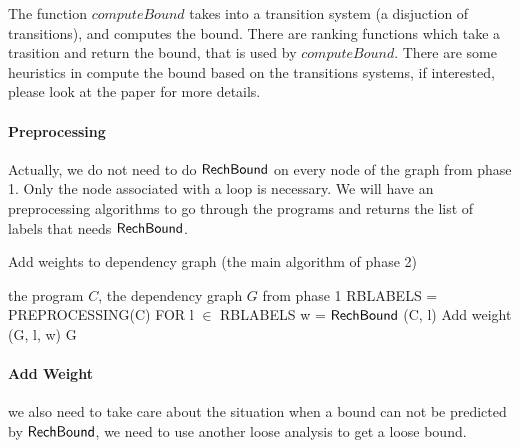 The function $computeBound$ takes into a transition system (a disjuction of transitions), and computes the bound. There are ranking functions which take a trasition and return the bound, that is used by $computeBound$. There are some heuristics in compute the bound based on the transitions systems, if interested, please look at the paper for more details.

\paragraph{Preprocessing} Actually, we do not need to do $\mathsf{RechBound}$ on every node of the graph from phase 1. Only the node associated with a loop is necessary. We will have an preprocessing algorithms to go through the programs and returns the list of labels that needs {$\mathsf{RechBound}$}. 

\begin{algorithm}
\caption{
{Add weights to dependency graph (the main algorithm of phase 2)}
\label{alg:rb}
}
\begin{algorithmic}
\REQUIRE the program $C$, the dependency graph $G$ from phase 1
\STATE  RBLABELS = PREPROCESSING(C) 
\STATE FOR l $\in$ RBLABELS
\STATE w = $\mathsf{RechBound}$ (C, l)
\STATE Add weight (G, l, w)
\RETURN G
\end{algorithmic}
\end{algorithm}

\paragraph{Add Weight} we also need to take care about the situation when a bound can not be predicted by {$\mathsf{RechBound}$}, we need to use another loose analysis to get a loose bound.

\clearpage
